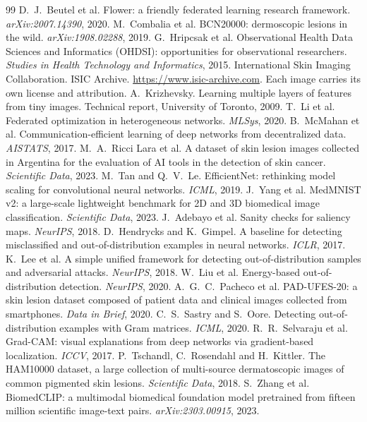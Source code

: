 \documentclass[11pt]{article}
\begin{document}
\begin{thebibliography}{99}\small
{} D.~J.~Beutel et al. Flower: a friendly federated learning research
framework. \emph{arXiv:2007.14390}, 2020.
 M.~Combalia et al. BCN20000: dermoscopic lesions in the wild.
\emph{arXiv:1908.02288}, 2019.
 G.~Hripcsak et al. Observational Health Data Sciences and Informatics
(OHDSI): opportunities for observational researchers. \emph{Studies in Health Technology and
Informatics}, 2015.
 International Skin Imaging Collaboration. ISIC Archive.
\url{https://www.isic-archive.com}. Each image carries its own license and attribution.
 A.~Krizhevsky. Learning multiple layers of features from tiny images.
Technical report, University of Toronto, 2009.
 T.~Li et al. Federated optimization in heterogeneous networks.
\emph{MLSys}, 2020.
 B.~McMahan et al. Communication-efficient learning of deep networks from
decentralized data. \emph{AISTATS}, 2017.
 M.~A.~Ricci Lara et al. A dataset of skin lesion images collected in
Argentina for the evaluation of AI tools in the detection of skin cancer. \emph{Scientific Data},
2023.
 M.~Tan and Q.~V.~Le. EfficientNet: rethinking model scaling for convolutional
neural networks. \emph{ICML}, 2019.
 J.~Yang et al. MedMNIST v2: a large-scale lightweight benchmark for 2D and 3D
biomedical image classification. \emph{Scientific Data}, 2023.
 J.~Adebayo et al. Sanity checks for saliency maps. \emph{NeurIPS}, 2018.
 D.~Hendrycks and K.~Gimpel. A baseline for detecting misclassified and
out-of-distribution examples in neural networks. \emph{ICLR}, 2017.
 K.~Lee et al. A simple unified framework for detecting out-of-distribution
samples and adversarial attacks. \emph{NeurIPS}, 2018.
 W.~Liu et al. Energy-based out-of-distribution detection. \emph{NeurIPS}, 2020.
 A.~G.~C.~Pacheco et al. PAD-UFES-20: a skin lesion dataset composed of
patient data and clinical images collected from smartphones. \emph{Data in Brief}, 2020.
 C.~S.~Sastry and S.~Oore. Detecting out-of-distribution examples with Gram
matrices. \emph{ICML}, 2020.
 R.~R.~Selvaraju et al. Grad-CAM: visual explanations from deep networks
via gradient-based localization. \emph{ICCV}, 2017.
 P.~Tschandl, C.~Rosendahl and H.~Kittler. The HAM10000 dataset, a large
collection of multi-source dermatoscopic images of common pigmented skin lesions.
\emph{Scientific Data}, 2018.
 S.~Zhang et al. BiomedCLIP: a multimodal biomedical foundation model
pretrained from fifteen million scientific image-text pairs. \emph{arXiv:2303.00915}, 2023.
\end{thebibliography}
\end{document}

